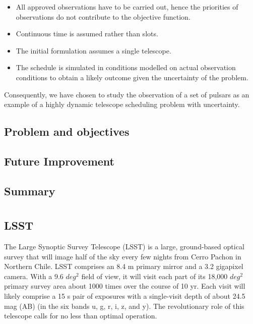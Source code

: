 \documentclass{article}
\begin{document}
\begin{itemize}
    \item  All approved observations have to be carried out, hence the priorities of
    observations do not contribute to the objective function.
    \item Continuous time is assumed rather than slots.
    \item The initial formulation assumes a single telescope.
    \item  The schedule is simulated in conditions modelled on actual 
    observation conditions to obtain a likely outcome given the uncertainty 
    of the problem.
\end{itemize}

Consequently, we have chosen to study the observation of a set of pulsars as an
example of a highly dynamic telescope scheduling problem with uncertainty.

\subsection*{Problem and objectives}

\subsection*{Future Improvement}

\subsection*{Summary}

\section*{\cite{naghib2019framework} }

\subsection*{LSST}

The Large Synoptic Survey Telescope (LSST) is a large,
ground-based optical survey that will image half of the sky
every few nights from Cerro Pachon in Northern Chile. LSST
comprises an 8.4 m primary mirror and a 3.2 gigapixel camera.
With a 9.6 \(deg^2\) field of view, it will visit each part of its
18,000 \(deg^2\) primary survey area about 1000 times over the
course of 10 yr. Each visit will likely comprise a 15 s pair of
exposures with a single-visit depth of about 24.5 mag (AB)
(in the six bands u, g, r, i, z, and y). The revolutionary role of
this telescope calls for no less than optimal operation.
\end{document}

